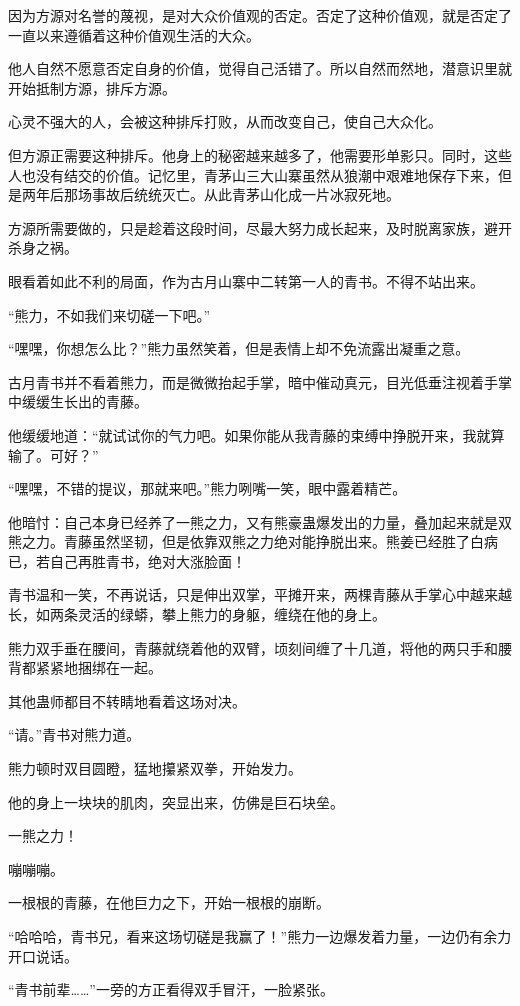 \begin{this_body}
因为方源对名誉的蔑视，是对大众价值观的否定。否定了这种价值观，就是否定了一直以来遵循着这种价值观生活的大众。

他人自然不愿意否定自身的价值，觉得自己活错了。所以自然而然地，潜意识里就开始抵制方源，排斥方源。

心灵不强大的人，会被这种排斥打败，从而改变自己，使自己大众化。

但方源正需要这种排斥。他身上的秘密越来越多了，他需要形单影只。同时，这些人也没有结交的价值。记忆里，青茅山三大山寨虽然从狼潮中艰难地保存下来，但是两年后那场事故后统统灭亡。从此青茅山化成一片冰寂死地。

方源所需要做的，只是趁着这段时间，尽最大努力成长起来，及时脱离家族，避开杀身之祸。

眼看着如此不利的局面，作为古月山寨中二转第一人的青书。不得不站出来。

“熊力，不如我们来切磋一下吧。”

“嘿嘿，你想怎么比？”熊力虽然笑着，但是表情上却不免流露出凝重之意。

古月青书并不看着熊力，而是微微抬起手掌，暗中催动真元，目光低垂注视着手掌中缓缓生长出的青藤。

他缓缓地道：“就试试你的气力吧。如果你能从我青藤的束缚中挣脱开来，我就算输了。可好？”

“嘿嘿，不错的提议，那就来吧。”熊力咧嘴一笑，眼中露着精芒。

他暗忖：自己本身已经养了一熊之力，又有熊豪蛊爆发出的力量，叠加起来就是双熊之力。青藤虽然坚韧，但是依靠双熊之力绝对能挣脱出来。熊姜已经胜了白病已，若自己再胜青书，绝对大涨脸面！

青书温和一笑，不再说话，只是伸出双掌，平摊开来，两棵青藤从手掌心中越来越长，如两条灵活的绿蟒，攀上熊力的身躯，缠绕在他的身上。

熊力双手垂在腰间，青藤就绕着他的双臂，顷刻间缠了十几道，将他的两只手和腰背都紧紧地捆绑在一起。

其他蛊师都目不转睛地看着这场对决。

“请。”青书对熊力道。

熊力顿时双目圆瞪，猛地攥紧双拳，开始发力。

他的身上一块块的肌肉，突显出来，仿佛是巨石块垒。

一熊之力！

嘣嘣嘣。

一根根的青藤，在他巨力之下，开始一根根的崩断。

“哈哈哈，青书兄，看来这场切磋是我赢了！”熊力一边爆发着力量，一边仍有余力开口说话。

“青书前辈……”一旁的方正看得双手冒汗，一脸紧张。


\end{this_body}
